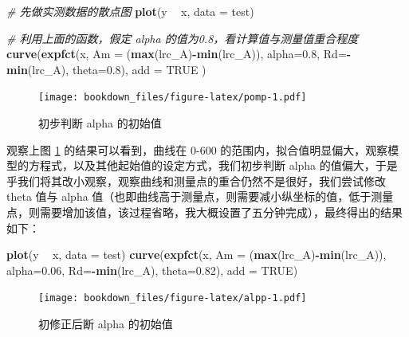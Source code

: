 \documentclass[
]{krantz}
\makeatletter
\newenvironment{Shaded}{\begin{snugshade}}{\end{snugshade}}
\newcommand{\CommentTok}[1]{\textcolor[rgb]{0.56,0.35,0.01}{\textit{#1}}}
\newcommand{\DataTypeTok}[1]{\textcolor[rgb]{0.13,0.29,0.53}{#1}}
\newcommand{\FloatTok}[1]{\textcolor[rgb]{0.00,0.00,0.81}{#1}}
\newcommand{\KeywordTok}[1]{\textcolor[rgb]{0.13,0.29,0.53}{\textbf{#1}}}
\newcommand{\NormalTok}[1]{#1}
\newcommand{\OperatorTok}[1]{\textcolor[rgb]{0.81,0.36,0.00}{\textbf{#1}}}
\newcommand{\OtherTok}[1]{\textcolor[rgb]{0.56,0.35,0.01}{#1}}
\newcommand{\StringTok}[1]{\textcolor[rgb]{0.31,0.60,0.02}{#1}}
\newenvironment{kframe}{%
\medskip{}
\setlength{\fboxsep}{.8em}
 \def\at@end@of@kframe{}%
 \ifinner\ifhmode%
  \def\at@end@of@kframe{\end{minipage}}%
  \begin{minipage}{\columnwidth}%
 \fi\fi%
 \def\FrameCommand##1{\hskip\@totalleftmargin \hskip-\fboxsep
 \colorbox{shadecolor}{##1}\hskip-\fboxsep
     \hskip-\linewidth \hskip-\@totalleftmargin \hskip\columnwidth}%
 \MakeFramed {\advance\hsize-\width
   \@totalleftmargin\z@ \linewidth\hsize
   \@setminipage}}%
 {\par\unskip\endMakeFramed%
 \at@end@of@kframe}
\renewenvironment{Shaded}{\begin{kframe}}{\end{kframe}}
\makeatother
\begin{document}
\begin{Shaded}
\begin{Highlighting}[]
\CommentTok{# 先做实测数据的散点图}
\KeywordTok{plot}\NormalTok{(y }\OperatorTok{~}\StringTok{ }\NormalTok{x, }\DataTypeTok{data =}\NormalTok{ test)}

\CommentTok{# 利用上面的函数，假定 alpha 的值为0.8，看计算值与测量值重合程度}
\KeywordTok{curve}\NormalTok{(}\KeywordTok{expfct}\NormalTok{(x, }\DataTypeTok{Am =}\NormalTok{ (}\KeywordTok{max}\NormalTok{(lrc_A)}\OperatorTok{-}\KeywordTok{min}\NormalTok{(lrc_A)),}
     \DataTypeTok{alpha=}\FloatTok{0.8}\NormalTok{, }\DataTypeTok{Rd=}\OperatorTok{-}\KeywordTok{min}\NormalTok{(lrc_A), }\DataTypeTok{theta=}\FloatTok{0.8}\NormalTok{), }\DataTypeTok{add =} \OtherTok{TRUE}
\NormalTok{             )}
\end{Highlighting}
\end{Shaded}

\begin{figure}
\centering
\texttt{[image: bookdown\_files/figure-latex/pomp-1.pdf]}
\caption{\label{fig:pomp}初步判断 alpha 的初始值}
\end{figure}

观察上图 \ref{fig:pomp} 的结果可以看到，曲线在 0-600 的范围内，拟合值明显偏大，观察模型的方程式，以及其他起始值的设定方式，我们初步判断 alpha 的值偏大，于是乎我们将其改小观察，观察曲线和测量点的重合仍然不是很好，我们尝试修改 theta 值与 alpha 值（也即曲线高于测量点，则需要减小纵坐标的值，低于测量点，则需要增加该值，该过程省略，我大概设置了五分钟完成），最终得出的结果如下：

\begin{Shaded}
\begin{Highlighting}[]
\KeywordTok{plot}\NormalTok{(y }\OperatorTok{~}\StringTok{ }\NormalTok{x, }\DataTypeTok{data =}\NormalTok{ test)}
\KeywordTok{curve}\NormalTok{(}\KeywordTok{expfct}\NormalTok{(x, }\DataTypeTok{Am =}\NormalTok{ (}\KeywordTok{max}\NormalTok{(lrc_A)}\OperatorTok{-}\KeywordTok{min}\NormalTok{(lrc_A)),}
     \DataTypeTok{alpha=}\FloatTok{0.06}\NormalTok{, }\DataTypeTok{Rd=}\OperatorTok{-}\KeywordTok{min}\NormalTok{(lrc_A), }\DataTypeTok{theta=}\FloatTok{0.82}\NormalTok{), }\DataTypeTok{add =} \OtherTok{TRUE}\NormalTok{)}
\end{Highlighting}
\end{Shaded}

\begin{figure}
\centering
\texttt{[image: bookdown\_files/figure-latex/alpp-1.pdf]}
\caption{\label{fig:alpp}初修正后断 alpha 的初始值}
\end{figure}
\end{document}
